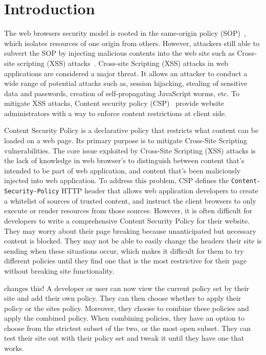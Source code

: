 \section{Introduction}
\label{sec:background}

The web browsers security model is rooted in the same-origin policy
(SOP)~\cite{sop}, which isolates resources of one origin from
others. However, attackers still able to subvert the SOP by injecting
malicious contents into the web site such as Cross-site scripting
(XSS) attacks~\cite{xss}. Cross-site Scripting (XSS) attacks in web
applications are considered a major threat. It allows an attacker to
conduct a wide range of potential attacks such as, session hijacking,
stealing of sensitive data and passwords, creation of self-propagating
JavaScript worms, etc. To mitigate XSS attacks, Content security
policy (CSP)~\cite{csp} provide website administrators with a way to
enforce content restrictions at client side.

Content Security Policy is a declarative policy that restricts what
content can be loaded on a web page.  Its primary purpose is to
mitigate Cross-Site Scripting vulnerabilities.  The core issue
exploited by Cross-Site Scripting (XSS) attacks is the lack of
knowledge in web browser’s to distinguish between content that’s
intended to be part of web application, and content that’s been
maliciously injected into web application.  To address this problem,
CSP defines the {\tt Content-Security-Policy} HTTP header that allows
web application developers to create a whitelist of sources of trusted
content, and instruct the client browsers to only execute or render
resources from those sources.  However, it is often difficult for
developers to write a comprehensive Content Security Policy for their
website.  They may worry about their page breaking because
unanticipated but necessary content is blocked.  They may not be able
to easily change the headers their site is sending when these
situations occur, which makes it difficult for them to try different
policies until they find one that is the most restrictive for their
page without breaking site functionality.

\codename changes this!  A developer or user can now view the current
policy set by their site and add their own policy.  They can then
choose whether to apply their policy or the sites policy.  Moreover,
they choose to combine these policies and apply the combined policy.
When combining policies, they have an option to choose from the
strictest subset of the two, or the most open subset.  They can test
their site out with their policy set and tweak it until they have one
that works. 

